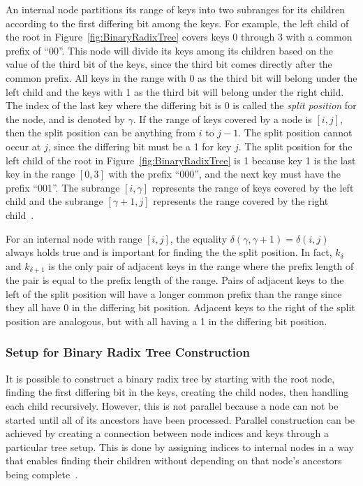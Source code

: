\documentclass{sig-alternate}
\begin{document}
An internal node partitions its range of keys into two subranges for its children according to the first differing bit among the keys. For example, the left child of the root in Figure~\ref{fig:BinaryRadixTree} covers keys 0 through 3 with a common prefix of ``00''. This node will divide its keys among its children based on the value of the third bit of the keys, since the third bit comes directly after the common prefix. All keys in the range with 0 as the third bit will belong under the left child and the keys with 1 as the third bit will belong under the right child. The index of the last key where the differing bit is 0 is called the \emph{split position} for the node, and is denoted by $\gamma$. If the range of keys covered by a node is $[i,j]$, then the split position can be anything from $i$ to $j-1$. The split position cannot occur at $j$, since the differing bit must be a 1 for key $j$. The split position for the left child of the root in Figure~\ref{fig:BinaryRadixTree} is 1 because key 1 is the last key in the range $[0,3]$ with the prefix ``000'', and the next key must have the prefix ``001''. The subrange $[i,\gamma]$ represents the range of keys covered by the left child and the subrange $[\gamma+1,j]$ represents the range covered by the right child~\cite{Karras:2012}.

For an internal node with range $[i,j]$, the equality $\delta(\gamma,\gamma+1)=\delta(i,j)$ always holds true and is important for finding the the split position. In fact, $k_{\delta}$ and $k_{\delta+1}$ is the only pair of adjacent keys in the range where the prefix length of the pair is equal to the prefix length of the range. Pairs of adjacent keys to the left of the split position will have a longer common prefix than the range since they all have 0 in the differing bit position. Adjacent keys to the right of the split position are analogous, but with all having a 1 in the differing bit position.

\subsubsection{Setup for Binary Radix Tree Construction}
\label{sec:setup}

It is possible to construct a binary radix tree by starting with the root node, finding the first differing bit in the keys, creating the child nodes, then handling each child recursively. However, this is not parallel because a node can not be started until all of its ancestors have been processed. Parallel construction can be achieved by creating a connection between node indices and keys through a particular tree setup. This is done by assigning indices to internal nodes in a way that enables finding their children without depending on that node's ancestors being complete~\cite{Karras:2012}.
\end{document}
